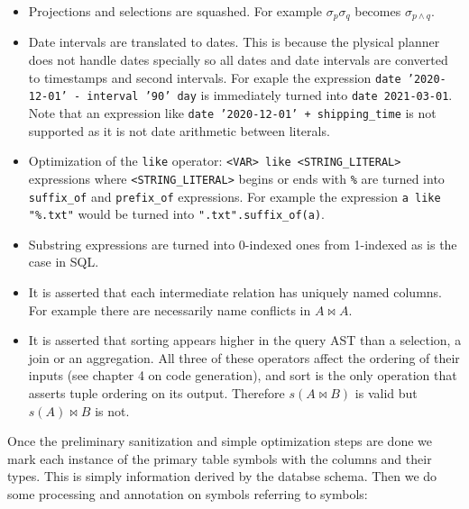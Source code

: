 \begin{itemize}
\item Projections and selections are squashed. For example
  \(\sigma_p\sigma_q\) becomes \(\sigma_{p \land q}\).
\item Date intervals are translated to dates. This is because the plysical
  planner does not handle dates specially so all dates and date
  intervals are converted to timestamps and second intervals. For
  exaple the expression \texttt{date '2020-12-01' - interval '90' day} is
  immediately turned into \texttt{date 2021-03-01}. Note that an expression
  like \texttt{date '2020-12-01' + shipping\_time} is not supported as it is
  not date arithmetic between literals.
\item Optimization of the \texttt{like} operator: \texttt{<VAR> like
    <STRING\_LITERAL>} expressions where \texttt{<STRING\_LITERAL>} begins or
  ends with \texttt{\%} are turned into \texttt{suffix\_of} and \texttt{prefix\_of}
  expressions. For example the expression \texttt{a like "\%.txt"} would be
  turned into \texttt{".txt".suffix\_of(a)}.
\item Substring expressions are turned into 0-indexed ones from
  1-indexed as is the case in SQL.
\item It is asserted that each intermediate relation has uniquely named
  columns. For example there are necessarily name conflicts in \(A
  \Join A\).
\item It is asserted that sorting appears higher in the query AST than a
  selection, a join or an aggregation. All three of these operators
  affect the ordering of their inputs (see chapter 4 on code
  generation), and sort is the only operation that asserts tuple
  ordering on its output. Therefore \(s(A \Join B)\) is valid but
  \(s(A) \Join B\) is not.
\end{itemize}

Once the preliminary sanitization and simple optimization steps are
done we mark each instance of the primary table symbols with the
columns and their types. This is simply information derived by the
databse schema. Then we do some processing and annotation on symbols
referring to symbols:

